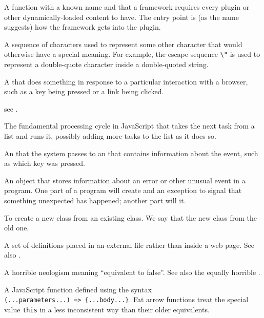 \begin{description}
A function with a known name and  that a framework
requires every plugin or other dynamically-loaded content to have. The entry
point is (as the name suggests) how the framework gets into the plugin.

A sequence of characters used to represent some other character that would
otherwise have a special meaning. For example, the escape sequence \texttt{\textbackslash{}"} is
used to represent a double-quote character inside a double-quoted string.

A  that does something in response to
a particular interaction with a browser, such as a key being pressed or a link
being clicked.

see .

The fundamental processing cycle in JavaScript that takes the next task from a
list and runs it, possibly adding more tasks to the list as it does so.

An  that the system passes to an  that contains information about the event, such as
which key was pressed.

An object that stores information about an error or other unusual event in a
program. One part of a program will create and  an exception
to signal that something unexpected has happened; another part will
 it.

To create a new class from an existing class. We say that the new class
 from the old one.

A set of  definitions placed in an external file
rather than inside a web page.
See also .

A horrible neologism meaning ``equivalent to false''. See also the equally
horrible .

A JavaScript function defined using the syntax \texttt{(...parameters...)\ ={\textgreater}\ \{...body...\}}.
Fat arrow functions treat the special value \texttt{this} in a less
inconsistent way than their older equivalents.


\end{description}
